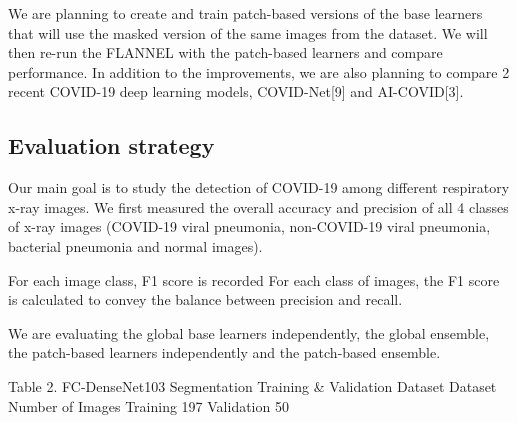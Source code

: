 \documentclass{sigkddExp}
\begin{document}
We are planning to create and train patch-based versions of the base learners
that will use the masked version of the same images from the dataset. We will
then re-run the FLANNEL with the patch-based learners and compare performance.
In addition to the improvements, we are  also planning to compare 2 recent
COVID-19 deep learning models, COVID-Net[9] and AI-COVID[3].


\subsection{Evaluation strategy}
Our main goal is to study the detection of COVID-19 among different respiratory
x-ray images. We first measured the overall accuracy and precision of all 4
classes of x-ray images (COVID-19 viral pneumonia, non-COVID-19 viral pneumonia,
bacterial pneumonia and normal images).

For each image class, F1 score is recorded For each class of images, the F1
score is calculated to convey the balance between precision and recall.

We are evaluating the global base learners independently, the global ensemble,
the patch-based learners independently and the patch-based ensemble.



Table 2. FC-DenseNet103 Segmentation Training \& Validation Dataset Dataset
Number of Images Training 197 Validation 50
\end{document}
